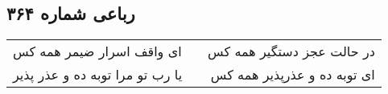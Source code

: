 \begin{center}
\section*{رباعی شماره ۳۶۴}
\label{sec:sh364}
\begin{longtable}{l p{0.5cm} r}
ای واقف اسرار ضیمر همه کس
&&
در حالت عجز دستگیر همه کس
\\
یا رب تو مرا توبه ده و عذر پذیر
&&
ای توبه ده و عذرپذیر همه کس
\\
\end{longtable}
\end{center}
